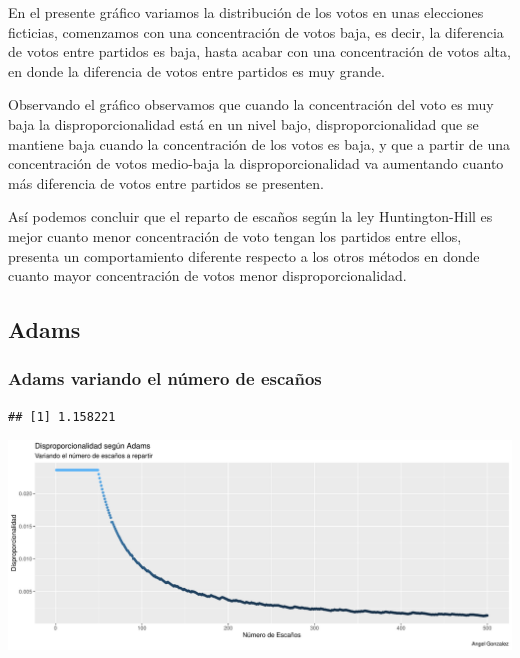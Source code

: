 \documentclass[12pt,a4paper,]{book}
\numberwithin{dummy}{section}
\theoremstyle{ocrenumbox}
\theoremstyle{blacknumex}
\theoremstyle{blacknumbox}
\theoremstyle{ocrenum}
\theoremstyle{ocrenum}
\begin{document}
En el presente gráfico variamos la distribución de los votos en unas
elecciones ficticias, comenzamos con una concentración de votos baja, es
decir, la diferencia de votos entre partidos es baja, hasta acabar con
una concentración de votos alta, en donde la diferencia de votos entre
partidos es muy grande.

Observando el gráfico observamos que cuando la concentración del voto es
muy baja la disproporcionalidad está en un nivel bajo,
disproporcionalidad que se mantiene baja cuando la concentración de los
votos es baja, y que a partir de una concentración de votos medio-baja
la disproporcionalidad va aumentando cuanto más diferencia de votos
entre partidos se presenten.

Así podemos concluir que el reparto de escaños según la ley
Huntington-Hill es mejor cuanto menor concentración de voto tengan los
partidos entre ellos, presenta un comportamiento diferente respecto a
los otros métodos en donde cuanto mayor concentración de votos menor
disproporcionalidad.

\hypertarget{adams}{%
\subsection{Adams}\label{adams}}

\hypertarget{adams-variando-el-nuxfamero-de-escauxf1os}{%
\subsubsection{Adams variando el número de
escaños}\label{adams-variando-el-nuxfamero-de-escauxf1os}}

\begin{verbatim}
## [1] 1.158221
\end{verbatim}

\begin{center}\includegraphics[width=0.95\linewidth]{figurasR/unnamed-chunk-34-1} \end{center}
\end{document}
